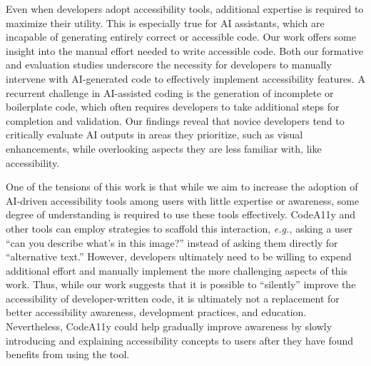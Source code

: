 


Even when developers adopt accessibility tools, additional expertise is required to maximize their utility.
This is especially true for AI assistants, which are incapable of generating entirely correct or accessible code. Our work offers some insight into the manual effort needed to write accessible code.
Both our formative and evaluation studies underscore the necessity for developers to manually intervene with AI-generated code to effectively implement accessibility features. A recurrent challenge in AI-assisted coding is the generation of incomplete or boilerplate code, which often requires developers to take additional steps for completion and validation. Our findings reveal that novice developers tend to critically evaluate AI outputs in areas they prioritize, such as visual enhancements, while overlooking aspects they are less familiar with, like accessibility.

One of the tensions of this work is that while we aim to increase the adoption of AI-driven accessibility tools among users with little expertise or awareness, some degree of understanding is required to use these tools effectively. CodeA11y and other tools can employ strategies to scaffold this interaction, \textit{e.g.,} asking a user ``can you describe what's in this image?'' instead of asking them directly for ``alternative text.'' However, developers ultimately need to be willing to expend additional effort and manually implement the more challenging aspects of this work. Thus, while our work suggests that it is possible to ``silently'' improve the accessibility of developer-written code, it is ultimately not a replacement for better accessibility awareness, development practices, and education. Nevertheless, CodeA11y could help gradually improve awareness by slowly introducing and explaining accessibility concepts to users after they have found benefits from using the tool.

